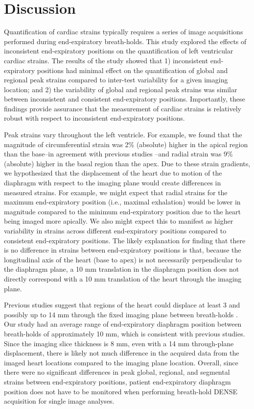\section{Discussion}
	Quantification of cardiac strains typically requires a series of image acquisitions performed during end-expiratory breath-holds. This study explored the effects of inconsistent end-expiratory positions on the quantification of left ventricular cardiac strains. The results of the study showed that 1) inconsistent end-expiratory positions had minimal effect on the quantification of global and regional peak strains compared to inter-test variability for a given imaging location; and 2) the variability of global and regional peak strains was similar between inconsistent and consistent end-expiratory positions. Importantly, these findings provide assurance that the measurement of cardiac strains is relatively robust with respect to inconsistent end-expiratory positions.
	
	Peak strains vary throughout the left ventricle. For example, we found that the magnitude of circumferential strain was 2\% (absolute) higher in the apical region than the base--in agreement with previous studies \cite{Kuijer2002,Moore2000,Young1994a,Feng2009,NasiraeiMoghaddam2010,Donekal2013a}--and radial strain was 9\% (absolute) higher in the basal region than the apex. Due to these strain gradients, we hypothesized that the displacement of the heart due to motion of the diaphragm with respect to the imaging plane would create differences in measured strains. For example, we might expect that radial strains for the maximum end-expiratory position (i.e., maximal exhalation) would be lower in magnitude compared to the minimum end-expiratory position due to the heart being imaged more apically. We also might expect this to manifest as higher variability in strains across different end-expiratory positions compared to consistent end-expiratory positions. The likely explanation for finding that there is no difference in strains between end-expiratory positions is that, because the longitudinal axis of the heart (base to apex) is not necessarily perpendicular to the diaphragm plane, a 10 mm translation in the diaphragm position does not directly correspond with a 10 mm translation of the heart through the imaging plane.
	
	Previous studies suggest that regions of the heart could displace at least 3 and possibly up to 14 mm through the fixed imaging plane between breath-holds \cite{Slomka2007,Swingen2003,Wang1995b,McLeish2002}. Our study had an average range of end-expiratory diaphragm position between breath-holds of approximately 10 mm, which is consistent with previous studies. Since the imaging slice thickness is 8 mm, even with a 14 mm through-plane displacement, there is likely not much difference in the acquired data from the imaged heart locations compared to the imaging plane location. Overall, since there were no significant differences in peak global, regional, and segmental strains between end-expiratory positions, patient end-expiratory diaphragm position does not have to be monitored when performing breath-hold DENSE acquisition for single image analyses.
	
